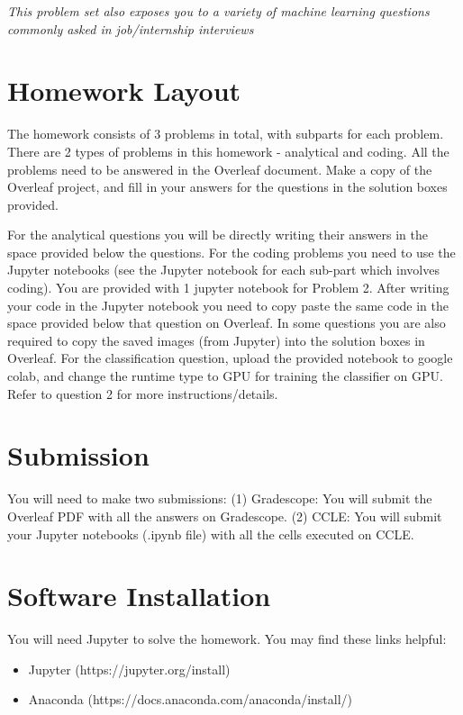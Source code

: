 \documentclass[answers]{exam}
\begin{document}
\emph{This problem set also exposes you to a variety of machine learning questions commonly asked in job/internship interviews}


\section*{Homework Layout}
The homework consists of 3 problems in total, with subparts for each problem. There are 2 types of problems in this homework - analytical and coding. All the problems need to be answered in the Overleaf document. Make a copy of the Overleaf project, and fill in your answers for the questions in the solution boxes provided. 

For the analytical questions you will be directly writing their answers in the space provided below the questions. For the coding problems you need to use the Jupyter notebooks (see the Jupyter notebook for each sub-part which involves coding). You are provided with 1 jupyter notebook for Problem 2. After writing your code in the Jupyter notebook you need to copy paste the same code in the space provided below that question on Overleaf. In some questions you are also required to copy the saved images (from Jupyter) into the solution boxes in Overleaf. For the classification question, upload the provided notebook to google colab, and change the runtime type to GPU for training the classifier on GPU. Refer to question 2 for more instructions/details. 

\section*{Submission}

You will need to make two submissions: (1) Gradescope: You will submit the Overleaf PDF with all the answers on Gradescope. (2) CCLE: You will submit your Jupyter notebooks (.ipynb file) with all the cells executed on CCLE. 

\section*{Software Installation}

You will need Jupyter to solve the homework. 
You may find these links helpful: 
\begin{itemize}
    \item Jupyter (https://jupyter.org/install)
    \item Anaconda (https://docs.anaconda.com/anaconda/install/)
\end{itemize}
\end{document}
